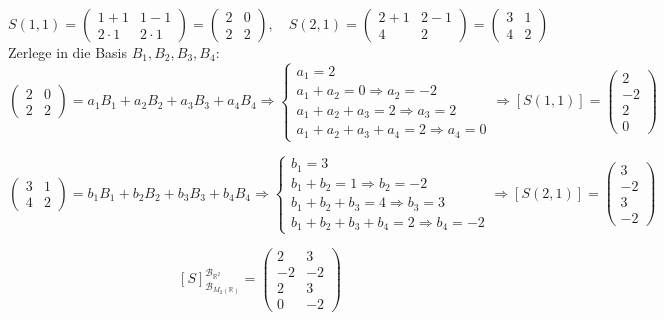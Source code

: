 \documentclass{article}
\begin{document}
\[
S(1,1) = \begin{pmatrix}1+1 & 1-1 \\ 2\cdot1 & 2\cdot1\end{pmatrix} = \begin{pmatrix}2 & 0 \\ 2 & 2\end{pmatrix}, \quad
S(2,1) = \begin{pmatrix}2+1 & 2-1 \\ 4 & 2\end{pmatrix} = \begin{pmatrix}3 & 1 \\ 4 & 2\end{pmatrix}
\]
Zerlege in die Basis \(B_1, B_2, B_3, B_4\):
\[
\begin{pmatrix}2 & 0 \\ 2 & 2\end{pmatrix} = a_1 B_1 + a_2 B_2 + a_3 B_3 + a_4 B_4
\Rightarrow
\begin{cases}
a_1 = 2 \\
a_1 + a_2 = 0 \Rightarrow a_2 = -2 \\
a_1 + a_2 + a_3 = 2 \Rightarrow a_3 = 2 \\
a_1 + a_2 + a_3 + a_4 = 2 \Rightarrow a_4 = 0
\end{cases}
\Rightarrow [S(1,1)] = \begin{pmatrix}2\\-2\\2\\0\end{pmatrix}
\]

\[
\begin{pmatrix}3 & 1 \\ 4 & 2\end{pmatrix} = b_1 B_1 + b_2 B_2 + b_3 B_3 + b_4 B_4
\Rightarrow
\begin{cases}
b_1 = 3 \\
b_1 + b_2 = 1 \Rightarrow b_2 = -2 \\
b_1 + b_2 + b_3 = 4 \Rightarrow b_3 = 3 \\
b_1 + b_2 + b_3 + b_4 = 2 \Rightarrow b_4 = -2
\end{cases}
\Rightarrow [S(2,1)] = \begin{pmatrix}3\\-2\\3\\-2\end{pmatrix}
\]

\[
[S]_{\mathcal{B}_{M_2(\mathbb{R})}}^{\mathcal{B}_{\mathbb{R}^2}} =
\begin{pmatrix}
2 & 3 \\
-2 & -2 \\
2 & 3 \\
0 & -2
\end{pmatrix}
\]
\end{document}
